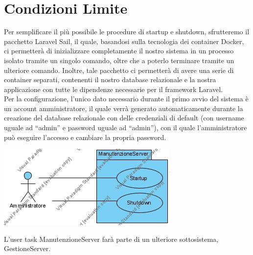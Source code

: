 \section{Condizioni Limite}
Per semplificare il più possibile le procedure di startup e shutdown, sfrutteremo il pacchetto Laravel Sail, il quale, basandosi sulla tecnologia dei container Docker, ci permetterà di inizializzare completamente il nostro sistema in un processo isolato tramite un singolo comando, oltre che a poterlo terminare tramite un ulteriore comando. Inoltre, tale pacchetto ci permetterà di avere una serie di container separati, contenenti il nostro database relazionale e la nostra applicazione con tutte le dipendenze necessarie per il framework Laravel. \\
Per la configurazione, l’unico dato necessario durante il primo avvio del sistema è un account amministratore, il quale verrà generato automaticamente durante la creazione del database relazionale con delle credenziali di default (con username uguale ad “admin” e password uguale ad “admin”), con il quale l’amministratore può eseguire l’accesso e cambiare la propria password.
\begin{center}
\includegraphics[width=\textwidth,height=\textheight,keepaspectratio]{Figure/ManageServerUseCase.jpg}
\end{center}

L’user task ManutenzioneServer farà parte di un ulteriore sottosistema, GestioneServer.
